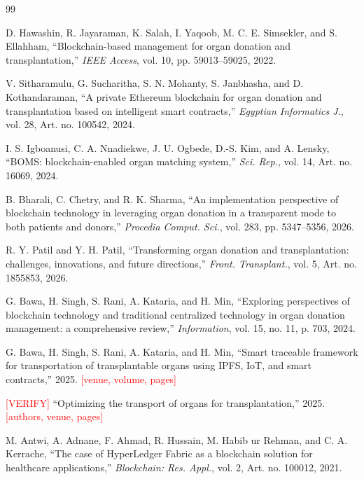 \documentclass[journal]{IEEEtran}
\newcommand{\todo}[1]{\textcolor{red}{[#1]}}
\begin{document}
\begin{thebibliography}{99}

D. Hawashin, R. Jayaraman, K. Salah, I. Yaqoob, M. C. E. Simsekler, and S. Ellahham,
``Blockchain-based management for organ donation and transplantation,''
\textit{IEEE Access}, vol. 10, pp. 59013--59025, 2022.

V. Sitharamulu, G. Sucharitha, S. N. Mohanty, S. Janbhasha, and D. Kothandaraman,
``A private Ethereum blockchain for organ donation and transplantation based on intelligent smart contracts,''
\textit{Egyptian Informatics J.}, vol. 28, Art. no. 100542, 2024.

I. S. Igboanusi, C. A. Nnadiekwe, J. U. Ogbede, D.-S. Kim, and A. Lensky,
``BOMS: blockchain-enabled organ matching system,''
\textit{Sci. Rep.}, vol. 14, Art. no. 16069, 2024.

B. Bharali, C. Chetry, and R. K. Sharma,
``An implementation perspective of blockchain technology in leveraging organ donation in a transparent mode to both patients and donors,''
\textit{Procedia Comput. Sci.}, vol. 283, pp. 5347--5356, 2026.

R. Y. Patil and Y. H. Patil,
``Transforming organ donation and transplantation: challenges, innovations, and future directions,''
\textit{Front. Transplant.}, vol. 5, Art. no. 1855853, 2026.

G. Bawa, H. Singh, S. Rani, A. Kataria, and H. Min,
``Exploring perspectives of blockchain technology and traditional centralized technology in organ donation management: a comprehensive review,''
\textit{Information}, vol. 15, no. 11, p. 703, 2024.

G. Bawa, H. Singh, S. Rani, A. Kataria, and H. Min,
``Smart traceable framework for transportation of transplantable organs using IPFS, IoT, and smart contracts,'' 2025. \todo{venue, volume, pages}

\todo{VERIFY} ``Optimizing the transport of organs for transplantation,'' 2025. \todo{authors, venue, pages}

M. Antwi, A. Adnane, F. Ahmad, R. Hussain, M. Habib ur Rehman, and C. A. Kerrache,
``The case of HyperLedger Fabric as a blockchain solution for healthcare applications,''
\textit{Blockchain: Res. Appl.}, vol. 2, Art. no. 100012, 2021.


\end{thebibliography}
\end{document}
